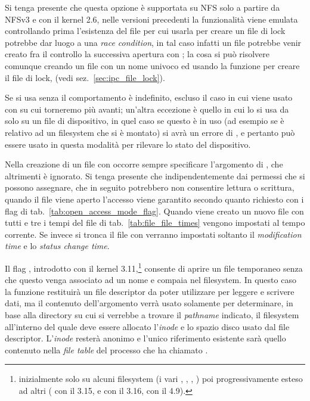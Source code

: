 Si tenga presente che questa opzione è supportata su NFS solo a partire da
NFSv3 e con il kernel 2.6, nelle versioni precedenti la funzionalità viene
emulata controllando prima l'esistenza del file per cui usarla per creare un
file di lock potrebbe dar luogo a una \textit{race condition}, in tal caso
infatti un file potrebbe venir creato fra il controllo la successiva apertura
con ; la cosa si può risolvere comunque creando un file con un
nome univoco ed usando la funzione  per creare il file di lock,
(vedi sez.~\ref{sec:ipc_file_lock}).

Se si usa  senza  il comportamento è
indefinito, escluso il caso in cui viene usato con  su cui
torneremo più avanti; un'altra eccezione è quello in cui lo si usa da solo su
un file di dispositivo, in quel caso se questo è in uso (ad esempio se è
relativo ad un filesystem che si è montato) si avrà un errore di
, e pertanto può essere usato in questa modalità per rilevare lo
stato del dispositivo.

Nella creazione di un file con  occorre sempre specificare
l'argomento di , che altrimenti è ignorato. Si tenga presente che
indipendentemente dai permessi che si possono assegnare, che in seguito
potrebbero non consentire lettura o scrittura, quando il file viene aperto
l'accesso viene garantito secondo quanto richiesto con i flag di
tab.~\ref{tab:open_access_mode_flag}.  Quando viene creato un nuovo file
 con tutti e tre i tempi del file di
tab.~\ref{tab:file_file_times} vengono impostati al tempo corrente. Se invece
si tronca il file con  verranno impostati soltanto il
\textit{modification time} e lo \textit{status change time}.

Il flag , introdotto con il kernel
3.11,\footnote{inizialmente solo su alcuni filesystem (i vari ,
  , , ) poi progressivamente esteso ad altri
  ( con il 3.15,  e  con il 3.16, 
  con il 4.9).}  consente di aprire un file temporaneo senza che questo venga
associato ad un nome e compaia nel filesystem. In questo caso la funzione
restituirà un file descriptor da poter utilizzare per leggere e scrivere dati,
ma il contenuto dell'argomento  verrà usato solamente per
determinare, in base alla directory su cui si verrebbe a trovare il
\textit{pathname} indicato, il filesystem all'interno del quale deve essere
allocato l'\textit{inode} e lo spazio disco usato dal file
descriptor. L'\textit{inode} resterà anonimo e l'unico riferimento esistente
sarà quello contenuto nella \textit{file table} del processo che ha chiamato
.

